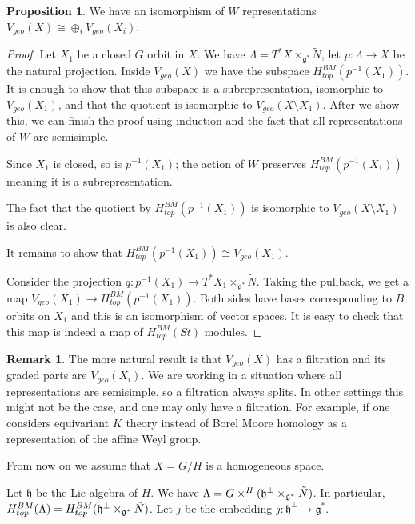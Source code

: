 \documentclass[12pt]{article}
\theoremstyle{plain}
\theoremstyle{definition}
\newtheorem{prop}[theorem]{Proposition}
\newtheorem{Remark}[theorem]{Remark}
\begin{document}
\begin{prop}
    We have an isomorphism of $W$ representations 
    $V_{geo}(X)\cong\oplus_i V_{geo}(X_i)$.
\end{prop}

\begin{proof} 
    Let $X_1$ be a closed $G$ orbit in $X$. We have $\Lambda=T^*X\times_{\mathfrak{g}^*}\tilde{N}$, let $p:\Lambda \to X$ be the natural projection. Inside $V_{geo}(X)$ we have the subspace $H^{BM}_{top}(p^{-1}(X_{1}))$. It is enough to show that this subspace is a subrepresentation, isomorphic to $V_{geo}(X_{1})$, and that the quotient is isomorphic to $V_{geo}(X\setminus X_{1})$. After we show this, we can finish the proof using induction and the fact that all representations of $W$ are semisimple.

     Since $X_{1}$ is closed, so is $p^{-1}(X_{1})$; the action of $W$ preserves $H^{BM}_{top}(p^{-1}(X_{1}))$ meaning it is a subrepresentation. 

    The fact that the quotient by $H^{BM}_{top}(p^{-1}(X_{1}))$ is isomorphic to $V_{geo}(X\setminus X_{1})$ is also clear.

    It remains to show that $H^{BM}_{top}(p^{-1}(X_{1}))\cong V_{geo}(X_{1})$.

    Consider the projection $q:p^{-1}(X_{1})\to T^*X_{1}\times_{\mathfrak{g}^*} \tilde{N}$. Taking the pullback, we get a map $V_{geo}(X_{1}) \to H^{BM}_{top}(p^{-1}(X_{1}))$. Both sides have bases corresponding to $B$ orbits on $X_{1}$ and this is an isomorphism of vector spaces. It is easy to check that this map is indeed a map of $H^{BM}_{top}(St)$ modules.


\end{proof}


\begin{Remark}
    The more natural result is that $V_{geo}(X)$ has a filtration and its graded parts are $V_{geo}(X_{i})$. We are working in a situation where all representations are semisimple, so a filtration always splits. In other settings this might not be the case, and one may only have a filtration. For example, if one considers equivariant $K$ theory instead of Borel Moore homology as a representation of the affine Weyl group.
\end{Remark}
From now on we assume that $X=G/H$ is a homogeneous space.

Let $\mathfrak{h}$ be the Lie algebra of $H$. We have $\Lambda=G\times^H(\mathfrak{h}^\perp\times_{\mathfrak{g}^*}\Tilde{N})$. In particular, $H_{top}^{BM}(\Lambda)=H_{top}^{BM}(\mathfrak{h}^\perp\times_{\mathfrak{g}^*}\Tilde{N})$. Let $j$ be the embedding $j:\mathfrak{h}^\perp\rightarrow \mathfrak{g}^*$. 
\end{document}
